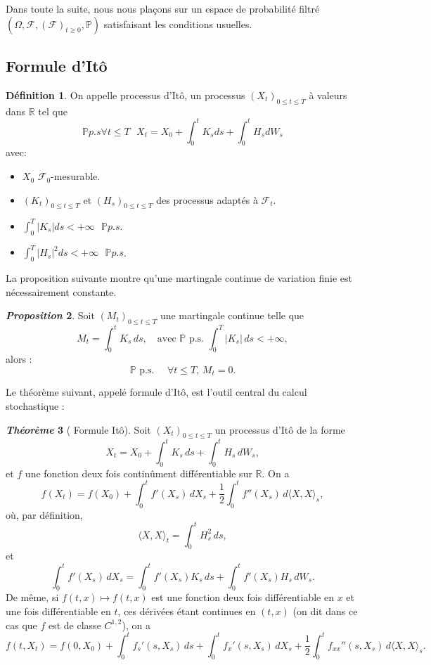 \documentclass[12pt,a4paper,twoside]{book}%
\theoremstyle{definition}
\newtheorem{dfn}{Définition}[section]
\newtheorem{thm}[dfn]{\textit{Théorème}}
\newtheorem{prop}[dfn]{\textit{Proposition}}
\numberwithin{equation}{section}
\begin{document}
Dans toute la suite, nous nous plaçons sur un espace de probabilité filtré $(\Omega,\mathcal{F},(\mathcal{F})_{t\geq0}, \mathbb{P})$ satisfaisant les conditions usuelles.
\subsection{Formule d'Itô}
\begin{dfn}
	On appelle processus d'Itô, un processus $(X_t)_{0\leq t\leq T}$ à valeurs dans $\mathbb{R}$ tel que
	\[
	\mathbb{P}p.s \forall t\leq T\text{   } X_t = X_0 + \int_{0}^{t}K_sds+\int_{0}^{t}H_sdW_s
	\]
	avec:
	\begin{itemize}
		\item $X_0$ $\mathcal{F}_0$-mesurable.
		\item $(K_t)_{0\leq t\leq T}$ et $(H_s)_{0\leq t\leq T}$ des processus adaptés à $\mathcal{F}_t$.
		\item $\int_{0}^{T}|K_s|ds<+\infty \text{  }\mathbb{P}p.s$.
		\item $\int_{0}^{T}|H_s|^2ds<+\infty\text{  }\mathbb{P}p.s$.
	\end{itemize}
\end{dfn}

La proposition suivante montre qu'une martingale continue de variation finie est nécessairement constante.
\begin{prop}
Soit \((M_t)_{0 \leq t \leq T}\) une martingale continue telle que 
\[
M_t = \int_0^t K_s \, ds, \quad \text{avec } \mathbb{P}\text{ p.s. } \int_0^T |K_s| \, ds < +\infty,
\]
alors :
\[
\mathbb{P}\text{ p.s. } \quad \forall t \leq T, \, M_t = 0.
\]
\end{prop}

Le théorème suivant, appelé formule d’Itô, est l’outil central du calcul stochastique :
\begin{thm}[ Formule Itô]
		Soit $(X_t)_{0 \le t \le T}$ un processus d'Itô de la forme
		\[
		X_t = X_0 + \int_0^t K_s \, ds + \int_0^t H_s \, dW_s,
		\]
		et $f$ une fonction deux fois continûment différentiable sur $\mathbb{R}$. On a
		\[
		f(X_t) = f(X_0) + \int_0^t f'(X_s) \, dX_s + \frac{1}{2} \int_0^t f''(X_s) \, d\langle X, X \rangle_s,
		\]
		où, par définition,
		\[
		\langle X, X \rangle_t = \int_0^t H_s^2 \, ds,
		\]
		et
		\[
		\int_0^t f'(X_s) \, dX_s = \int_0^t f'(X_s) K_s \, ds + \int_0^t f'(X_s) H_s \, dW_s.
		\]
		De même, si $f(t,x) \mapsto f(t,x)$ est une fonction deux fois différentiable en $x$ et une fois différentiable en $t$, ces dérivées étant continues en $(t,x)$ (on dit dans ce cas que $f$ est de classe $C^{1,2}$), on a
		\[
		f(t, X_t) = f(0, X_0) + \int_0^t f_s'(s, X_s) \, ds 
		+ \int_0^t f_x'(s, X_s) \, dX_s + \frac{1}{2} \int_0^t f_{xx}''(s, X_s) \, d\langle X, X \rangle_s.
		\]
\end{thm}
\end{document}
